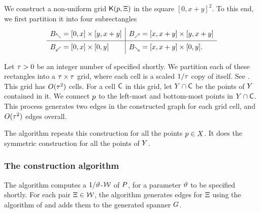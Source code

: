 \documentclass[12pt]{article}%
\begin{document}
We construct a non-uniform grid $\mathsf{K}(p, \Xi)$ in the square
$[0,x+y]^2$.  To this end, we first partition it into four
subrectangles
\begin{equation*}
    \begin{array}{l|l}
      B_\nwarrow = [0,x] \times [y,x+y]
      &
        B_\nearrow = [x,x+y] \times [y,x+y]\Bigr.\\
      \hline
      B_{\swarrow} = [0,x]\times [0,y]
      &
        B_\searrow = [x,x+y] \times [0,y].\Bigr.\\
    \end{array}
\end{equation*}

\newcommand{\gConst}{\Mh{\tau}}%

Let $\gConst > 0$ be an integer number of specified shortly.  We
partition each of these rectangles into a $\gConst \times \gConst$
grid, where each cell is a scaled $1/\gConst$ copy of itself.  See
. This grid has $O(\gConst^2)$ cells. For a cell $\mathsf{C}$
in this grid, let $Y \cap \mathsf{C}$ be the points of $Y$ contained
in it. We connect $p$ to the left-most and bottom-most points in
$Y \cap \mathsf{C}$. This process generates two edges in the constructed
graph for each grid cell, and $O( \gConst^2)$ edges overall.

The algorithm repeats this construction for all the points
$p \in X$. It does the symmetric construction for all the points
of $Y$.


\subsubsection{The construction algorithm}

The algorithm computes a $1/\vartheta$-\QSPD $\mathcal{W}$ of $P$, for a
parameter $\vartheta$ to be specified shortly. For each pair
$\Xi \in \mathcal{W}$, the algorithm generates edges for $\Xi$ using the
algorithm of  and adds them to the generated
spanner $G$.
\end{document}
